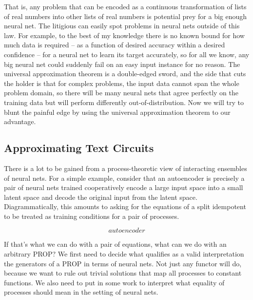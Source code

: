 \begin{fullwidth}
That is, any problem that can be encoded as a continuous transformation of lists of real numbers into other lists of real numbers is potential prey for a big enough neural net. The litigious can easily spot problems in neural nets outside of this law. For example, to the best of my knowledge there is no known bound for how much data is required -- as a function of desired accuracy within a desired confidence -- for a neural net to learn its target accurately, so for all we know, any big neural net could suddenly fail on an easy input instance for no reason. The universal approximation theorem is a double-edged sword, and the side that cuts the holder is that for complex problems, the input data cannot span the whole problem domain, so there will be many neural nets that agree perfectly on the training data but will perform differently out-of-distribution. Now we will try to blunt the painful edge by using the universal approximation theorem to our advantage.

\subsection{Approximating Text Circuits}

There is a lot to be gained from a process-theoretic view of interacting ensembles of neural nets. For a simple example, consider that an autoencoder is precisely a pair of neural nets trained cooperatively encode a large input space into a small latent space and decode the original input from the latent space. Diagrammatically, this amounts to asking for the equations of a split idempotent to be treated as training conditions for a pair of processes.

\[autoencoder\]

If that's what we can do with a pair of equations, what can we do with an arbitrary PROP? We first need to decide what qualifies as a valid interpretation the generators of a PROP in terms of neural nets. Not just any functor will do, because we want to rule out trivial solutions that map all processes to constant functions. We also need to put in some work to interpret what equality of processes should mean in the setting of neural nets.


\end{fullwidth}

